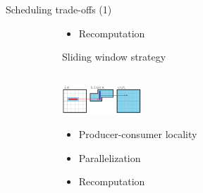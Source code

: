 \documentclass[8pt,a4paper,oneside,hidelinks,aspectratio=169,dvipsnames]{beamer}
\newcommand{\cmark}{\ding{51}\xspace}%
\newcommand{\xmark}{\ding{55}\xspace}%
\begin{document}
\begin{frame}[fragile]{Scheduling trade-offs (1)}
\begin{figure}[H]
{\begin{minipage}{1.2\textwidth}
\begin{subfigure}[H]{.31\textwidth}
\begin{itemize}
            \item[\xmark\xmark] Recomputation
          \end{itemize}
        \end{subfigure}
        \begin{subfigure}[H]{.3475\textwidth}
          \centering
          Sliding window strategy
          \inputminted[tabsize=2,frame=single,rulecolor=gray,fontsize=\fontsize{4.2}{3}]{cpp}{fig/blur_3x3_sliding_window.cpp}
          \centering
          \includegraphics[width=3cm]{img/halide-sliding-window.png}
          \begin{itemize}
            \item[\cmark\cmark] Producer-consumer locality
            \item[\xmark\xmark] Parallelization
            \item[\cmark\cmark] Recomputation
          \end{itemize}
        \end{subfigure}
      \end{minipage}
    }
    \centering
    \unskip
    \vspace{0.3cm}
  \end{figure}
\end{frame}
\end{document}
